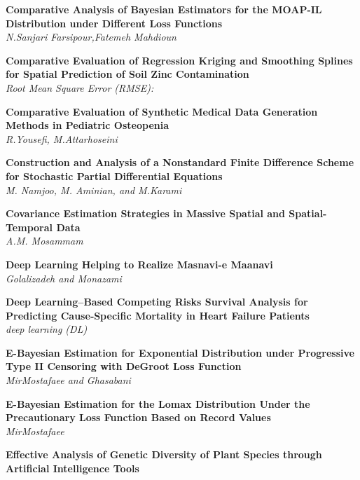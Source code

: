 \noindent
{\bf
Comparative Analysis of Bayesian Estimators for the MOAP-IL Distribution under Different Loss Functions
}\dotfill \pageref{p.1200}\\
{\small \it
N.Sanjari Farsipour,Fatemeh Mahdioun
}


\noindent
{\bf
Comparative Evaluation of Regression Kriging and Smoothing Splines for Spatial Prediction of Soil Zinc Contamination
}\dotfill \pageref{p.1187}\\
{\small \it
Root Mean Square Error (RMSE):
}


\noindent
{\bf
Comparative Evaluation of Synthetic Medical Data Generation Methods in Pediatric Osteopenia
}\dotfill \pageref{p.1162}\\
{\small \it
R.Yousefi, M.Attarhoseini
}


\noindent
{\bf
Construction and Analysis of a Nonstandard Finite Difference Scheme for Stochastic Partial Differential Equations
}\dotfill \pageref{p.1205}\\
{\small \it
M. Namjoo, M. Aminian, and M.Karami
}


\noindent
{\bf
Covariance Estimation Strategies in Massive Spatial and Spatial-Temporal Data
}\dotfill \pageref{p.1015}\\
{\small \it
A.M. Mosammam
}


\noindent
{\bf
Deep Learning Helping to Realize Masnavi-e Maanavi
}\dotfill \pageref{p.1151}\\
{\small \it
Golalizadeh and Monazami
}


\noindent
{\bf
Deep Learning--Based Competing Risks Survival Analysis for Predicting Cause‑Specific Mortality in Heart Failure Patients
}\dotfill \pageref{p.1209}\\
{\small \it
deep learning (DL)
}


\noindent
{\bf
E-Bayesian Estimation for Exponential Distribution under Progressive Type II Censoring with DeGroot Loss Function
}\dotfill \pageref{p.1314}\\
{\small \it
MirMostafaee and Ghasabani
}


\noindent
{\bf
E-Bayesian Estimation for the Lomax Distribution Under the Precautionary Loss Function Based on Record Values
}\dotfill \pageref{p.1329}\\
{\small \it
MirMostafaee
}


\noindent
{\bf
Effective Analysis of Genetic Diversity of Plant Species through Artificial Intelligence Tools
}\dotfill \pageref{p.1097}\\
{\small \it

}


